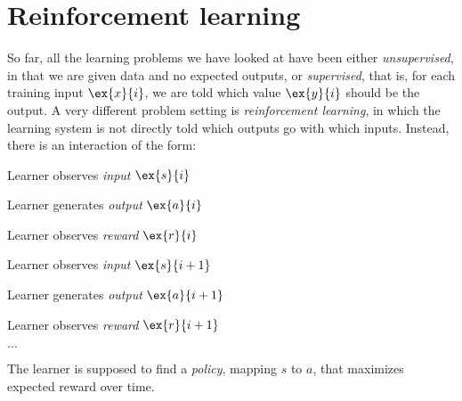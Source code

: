 \chapter{Reinforcement learning}
\label{chap:reinforcement}

So far, all the learning problems we have looked at have been either
{\em unsupervised}, in that we are given data and no expected outputs,
or {\em supervised}, that is, for each training input $\ex{x}{i}$, we
are told which value $\ex{y}{i}$ should be the output.  A very
different problem setting is {\em reinforcement learning}, in which
the learning system is not directly told which outputs go with which
inputs.  Instead, there is an interaction of the form:
\begin{compactitem}
\item Learner observes {\em input} $\ex{s}{i}$
\item Learner generates {\em output} $\ex{a}{i}$
\item Learner observes {\em reward} $\ex{r}{i}$
\item Learner observes {\em input} $\ex{s}{i+1}$
\item Learner generates {\em output} $\ex{a}{i+1}$
\item Learner observes {\em reward} $\ex{r}{i+1}$
\item $\ldots$
\end{compactitem}
The learner is supposed to find a {\em policy}, mapping $s$ to $a$,
that maximizes expected reward over time.

\begin{center}
\end{center}

